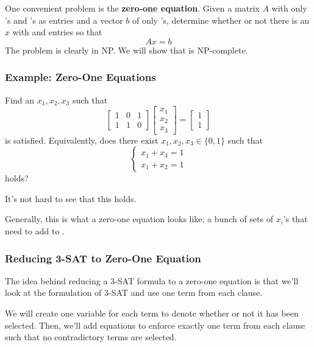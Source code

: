 \documentclass[letterpaper]{article}
\begin{document}
\bigskip 

One convenient problem is the \textbf{zero-one equation}. Given a matrix $A$ with only 's and 's as entries and a vector $b$ of only 's, determine whether or not there is an $x$ with  and  entries so that 
\[Ax = b\]
The problem is clearly in NP. We will show that is NP-complete. 

\subsubsection{Example: Zero-One Equations}
Find an $x_1, x_2, x_3$ such that 
\[\begin{bmatrix}
    1 & 0 & 1 \\ 1 & 1 & 0
\end{bmatrix} \begin{bmatrix}
    x_1 \\ x_2 \\ x_3
\end{bmatrix} = \begin{bmatrix}
    1 \\ 1
\end{bmatrix}\]
is satisfied. Equivalently, does there exist $x_1, x_2, x_3 \in \{0, 1\}$ such that 
\[\begin{cases}
    x_1 + x_3 = 1 \\ 
    x_1 + x_2 = 1
\end{cases}\]
holds? 

\begin{mdframed}[]
    It's not hard to see that this holds.     
\end{mdframed}

Generally, this is what a zero-one equation looks like; a bunch of sets of $x_i$'s that need to add to . 

\subsubsection{Reducing 3-SAT to Zero-One Equation}
The idea behind reducing a 3-SAT formula to a zero-one equation is that we'll look at the formulation of 3-SAT and use one term from each clause. 

\bigskip 

We will create one variable for each term to denote whether or not it has been selected. Then, we'll add equations to enforce exactly one term from each clause such that no contradictory terms are selected. 

\bigskip 
\end{document}
